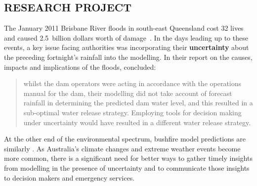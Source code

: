 \documentclass[a4paper,fontsize=12pt]{scrartcl}
\begin{document}
\subsection*{RESEARCH PROJECT}

The January 2011 Brisbane River floods in south-east Queensland cost
32 lives and caused 2.5~billion dollars worth of
damage~\parencite{vandenhonert_2011_2011}. In the days leading up to
these events, a key issue facing authorities was incorporating their
\textbf{uncertainty} about the preceding fortnight's rainfall into the
modelling. In their report on the causes, impacts and implications of
the floods, \textcite[p1170]{vandenhonert_2011_2011} concluded:
\blockquote{whilst the dam operators were acting in accordance with
  the operations manual for the dam, their modelling did not take
  account of forecast rainfall in determining the predicted dam water
  level, and this resulted in a sub-optimal water release strategy.
  Employing tools for decision making under uncertainty would have
  resulted in a different water release strategy.} At the other end of
the environmental spectrum, bushfire model predictions are similarly
. As Australia's climate changes and extreme weather
events become more common, there is a significant need for better ways
to gather timely insights from modelling in the presence of
uncertainty and to communicate those insights to decision makers and
emergency services.
\end{document}
